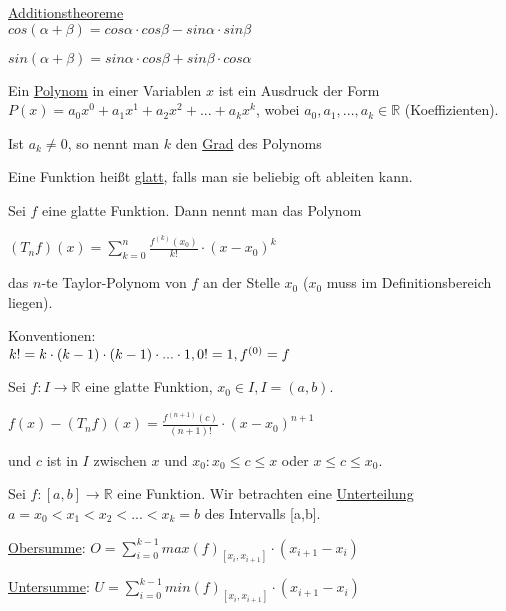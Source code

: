 \documentclass{mg2}
\begin{document}
\underline{Additionstheoreme}\\[1em]
$cos(\alpha + \beta) = cos\alpha \cdot cos \beta - sin \alpha \cdot sin \beta$

$sin(\alpha + \beta) = sin \alpha \cdot cos \beta + sin \beta \cdot cos \alpha$

\begin{definition}[Polynom]
Ein \underline{Polynom} in einer Variablen $x$ ist ein Ausdruck der Form $P(x) = a_0 x^0 + a_1 x^1 + a_2 x^2 + ... + a_k x^k$, wobei $a_0,a_1,...,a_k \in \mathbb{R}$ (Koeffizienten).

Ist $a_k \neq 0$, so nennt man $k$ den \underline{Grad} des Polynoms
\end{definition}

\begin{definition}
Eine Funktion heißt \underline{glatt}, falls man sie beliebig oft ableiten kann.
\end{definition}

\begin{definition}
Sei $f$ eine glatte Funktion. Dann nennt man das Polynom 

$(T_n f)(x) = \sum\nolimits_{k=0}^n \frac{f^{(k)} (x_0)}{k!} \cdot (x-x_0)^k$ 

das $n$-te Taylor-Polynom von $f$ an der Stelle $x_0$ ($x_0$ muss im Definitionsbereich liegen).

Konventionen:\\
 $k! = k\cdot(k-1)\cdot(k-1)\cdot... \cdot 1,\\
  0! = 1,\\
   f^{(0)} = f$
\end{definition}

\begin{satz}
Sei $f: I \to \mathbb{R}$ eine glatte Funktion, $x_0 \in I, I = (a,b)$.

$f(x) - (T_n f)(x) = \frac{f^{(n+1)}(c)}{(n+1)!} \cdot (x-x_0)^{n+1}$

und $c$ ist in $I$ zwischen $x$ und $x_0: x_0 \leq c \leq x$ oder $x \leq c \leq x_0$.
\end{satz}

\begin{definition}
Sei $f: [a,b] \to \mathbb{R}$ eine Funktion. Wir betrachten eine \underline{Unterteilung} $a = x_0 < x_1 < x_2 < ... < x_k = b$ des Intervalls [a,b].

\underline{Obersumme}: $O = \sum\nolimits_{i=0}^{k-1} max(f)_{[x_i, x_{i+1}]} \cdot (x_{i+1} - x_i)$

\underline{Untersumme}: $U = \sum\nolimits_{i=0}^{k-1} min(f)_{[x_i, x_{i+1}]} \cdot (x_{i+1} - x_i)$
\end{definition}
\end{document}
